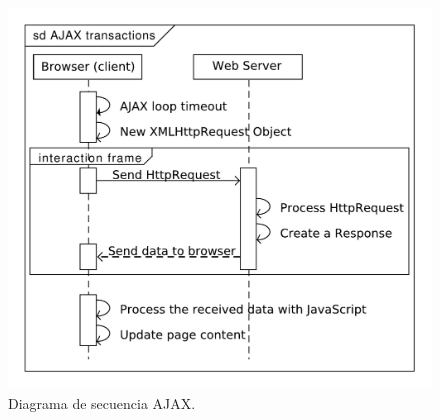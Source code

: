 \begin{figure}[htb!]
	\centering
    \includegraphics[width=.7\textwidth]{./Figures/ajax.pdf}
	\caption{Diagrama de secuencia AJAX.}
	\label{fig:ajax}
\end{figure}




